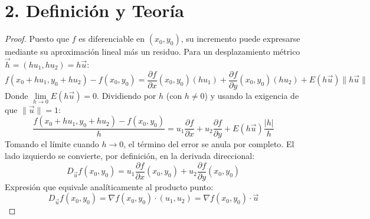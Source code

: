 \documentclass[11pt]{article}
\newenvironment{teoria}{%
  \section*{2. Definición y Teoría}%
}{}
\begin{document}
\begin{teoria}
  \begin{proof}
    Puesto que $f$ es diferenciable en $(x_0, y_0)$, su incremento puede expresarse mediante su aproximación lineal más un residuo. Para un desplazamiento métrico $\vec{h} = (h u_1, h u_2) = h\vec{u}$:
    $$ f(x_0 + h u_1, y_0 + h u_2) - f(x_0, y_0) = \dfrac{\partial f}{\partial x}(x_0,y_0)(h u_1) + \dfrac{\partial f}{\partial y}(x_0,y_0)(h u_2) + E(h\vec{u})\|h\vec{u}\| $$
    Donde $\lim\limits_{h \to 0} E(h\vec{u}) = 0$. Dividiendo por $h$ (con $h \neq 0$) y usando la exigencia de que $\|\vec{u}\| = 1$:
    $$ \dfrac{f(x_0 + h u_1, y_0 + h u_2) - f(x_0, y_0)}{h} = u_1 \dfrac{\partial f}{\partial x} + u_2 \dfrac{\partial f}{\partial y} + E(h\vec{u}) \dfrac{|h|}{h} $$
    Tomando el límite cuando $h \to 0$, el término del error se anula por completo. El lado izquierdo se convierte, por definición, en la derivada direccional:
    $$ D_{\vec{u}}f(x_0, y_0) = u_1 \dfrac{\partial f}{\partial x}(x_0,y_0) + u_2 \dfrac{\partial f}{\partial y}(x_0,y_0) $$
    Expresión que equivale analíticamente al producto punto:
    $$ D_{\vec{u}}f(x_0, y_0) = \nabla f(x_0, y_0) \cdot (u_1, u_2) = \nabla f(x_0, y_0) \cdot \vec{u} $$
  \end{proof}

\end{teoria}
\end{document}
